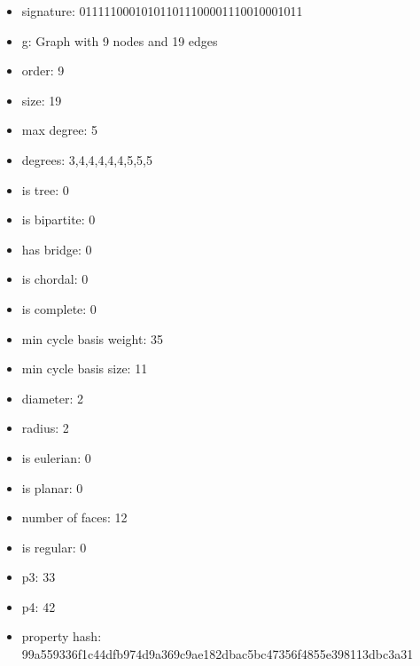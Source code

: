 \newpage
\begin{figure}
\end{figure}
\begin{itemize}
\item signature: 011111000101011011100001110010001011
\item g: Graph with 9 nodes and 19 edges
\item order: 9
\item size: 19
\item max degree: 5
\item degrees: 3,4,4,4,4,4,5,5,5
\item is tree: 0
\item is bipartite: 0
\item has bridge: 0
\item is chordal: 0
\item is complete: 0
\item min cycle basis weight: 35
\item min cycle basis size: 11
\item diameter: 2
\item radius: 2
\item is eulerian: 0
\item is planar: 0
\item number of faces: 12
\item is regular: 0
\item p3: 33
\item p4: 42
\item property hash: 99a559336f1c44dfb974d9a369c9ae182dbac5bc47356f4855e398113dbc3a31
\end{itemize}
